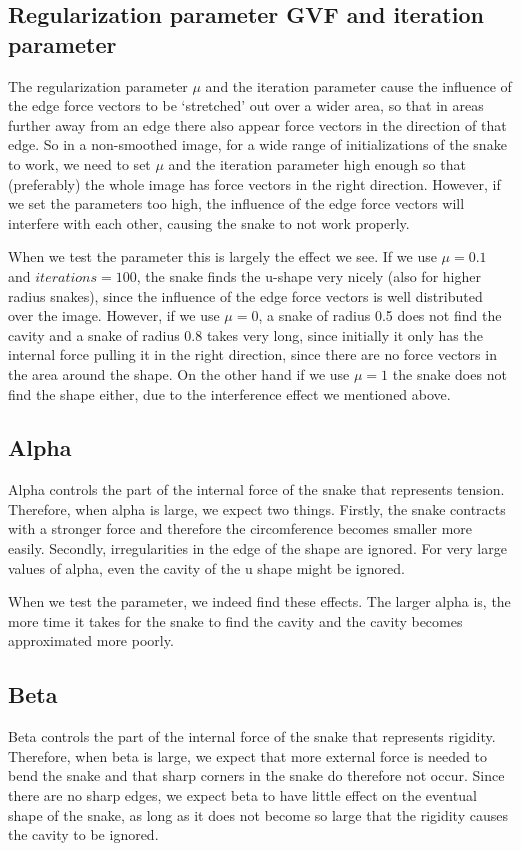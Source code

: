 \documentclass{article}
\begin{document}
\subsection{Regularization parameter GVF and iteration parameter}
The regularization parameter $\mu$ and the iteration parameter cause the influence of the edge force vectors to be `stretched' out over a wider area, so that in areas further away from an edge there also appear force vectors in the direction of that edge. So in a non-smoothed image, for a wide range of initializations of the snake to work, we need to set $\mu$ and the iteration parameter high enough so that (preferably) the whole image has force vectors in the right direction. However, if we set the parameters too high, the influence of the edge force vectors will interfere with each other, causing the snake to not work properly.

When we test the parameter this is largely the effect we see. If we use $\mu = 0.1$ and $iterations = 100$, the snake finds the u-shape very nicely (also for higher radius snakes), since the influence of the edge force vectors is well distributed over the image. However, if we use $\mu = 0$, a snake of radius 0.5 does not find the cavity and a snake of radius 0.8 takes very long, since initially it only has the internal force pulling it in the right direction, since there are no force vectors in the area around the shape. On the other hand if we use $\mu = 1$ the snake does not find the shape either, due to the interference effect we mentioned above.

\subsection{Alpha}
Alpha controls the part of the internal force of the snake that represents tension. Therefore, when alpha is large, we expect two things. Firstly, the snake contracts with a stronger force and therefore the circomference becomes smaller more easily. Secondly, irregularities in the edge of the shape are ignored. For very large values of alpha, even the cavity of the u shape might be ignored.

When we test the parameter, we indeed find these effects. The larger alpha is, the more time it takes for the snake to find the cavity and the cavity becomes approximated more poorly.

\subsection{Beta}
Beta controls the part of the internal force of the snake that represents rigidity. Therefore, when beta is large, we expect that more external force is needed to bend the snake and that sharp corners in the snake do therefore not occur. Since there are no sharp edges, we expect beta to have little effect on the eventual shape of the snake, as long as it does not become so large that the rigidity causes the cavity to be ignored.
\end{document}
